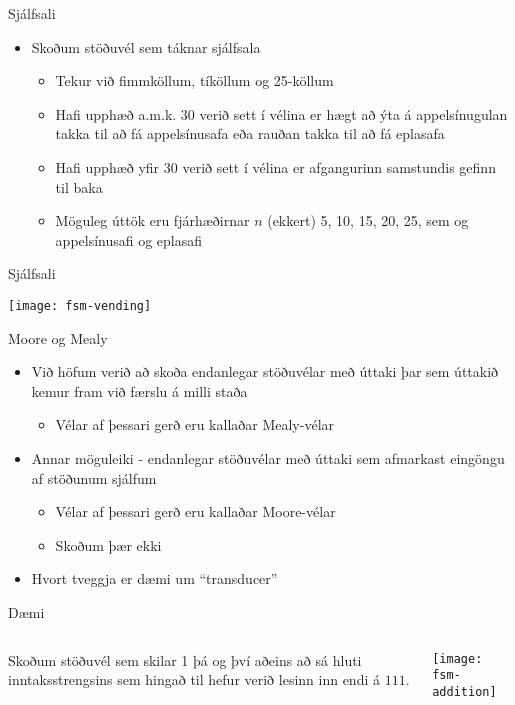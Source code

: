 \documentclass{beamer}
\begin{document}
\begin{frame}{Sjálfsali}
\begin{itemize}
 \item Skoðum stöðuvél sem táknar sjálfsala
 \begin{itemize}
  \item Tekur við fimmköllum, tíköllum og 25-köllum
  \item Hafi upphæð a.m.k. 30 verið sett í vélina er hægt að ýta á appelsínugulan takka til að fá appelsínusafa eða rauðan takka til að fá eplasafa
  \item Hafi upphæð yfir 30 verið sett í vélina er afgangurinn samstundis gefinn til baka
  \item Möguleg úttök eru fjárhæðirnar $n$ (ekkert) 5, 10, 15, 20, 25, sem og appelsínusafi og eplasafi
 \end{itemize}
\end{itemize}
\end{frame}

\begin{frame}{Sjálfsali}
\begin{center}
\texttt{[image: fsm-vending]}
\end{center}
\end{frame}

\begin{frame}{Moore og Mealy}
\begin{itemize}
 \item Við höfum verið að skoða endanlegar stöðuvélar með úttaki þar sem úttakið kemur fram við færslu á milli staða
 \begin{itemize}
  \item Vélar af þessari gerð eru kallaðar Mealy-vélar
 \end{itemize}
 \item Annar möguleiki - endanlegar stöðuvélar með úttaki sem afmarkast eingöngu af stöðunum sjálfum
 \begin{itemize}
  \item Vélar af þessari gerð eru kallaðar Moore-vélar
  \item Skoðum þær ekki
 \end{itemize}
 \item Hvort tveggja er dæmi um ``transducer''
\end{itemize}
\end{frame}

\begin{frame}{Dæmi}
\begin{columns}
Skoðum stöðuvél sem skilar 1 þá og því aðeins að sá hluti inntaksstrengsins sem hingað til hefur verið lesinn inn endi á $111$.

\texttt{[image: fsm-addition]}
\end{columns}
\end{frame}
\end{document}
